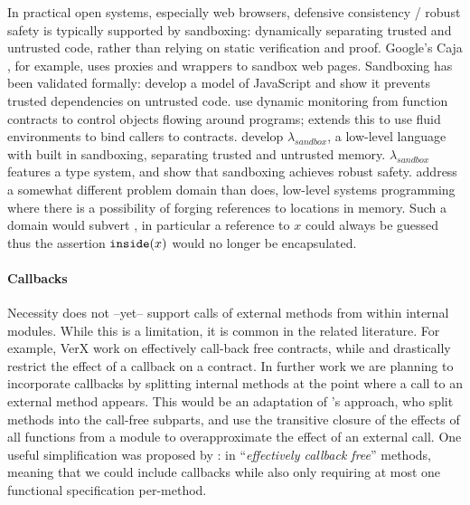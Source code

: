 In practical open systems, especially web browsers, defensive
consistency / robust safety is typically supported by sandboxing: dynamically separating
trusted and untrusted code, rather than relying on static verification
and proof.
Google's Caja \cite{Caja}, for example, uses proxies and wrappers to
sandbox web pages.
Sandboxing has been validated
formally:  \cite{mmt-oakland10} develop a model of
JavaScript and show it prevents trusted dependencies on untrusted code.
%
\cite{DPCC14} use dynamic monitoring from function contracts to
control objects flowing around programs; 
\cite{AuthContract} extends this to use fluid 
environments to bind callers to contracts.
%
\cite{sandbox} develop $\lambda_{sandbox}$, a low-level language with 
built in sandboxing, separating trusted and
untrusted memory. $\lambda_{sandbox}$ features a type system,
and \citeauthor{sandbox} show that sandboxing achieves robust safety.
\citeauthor{sandbox} address a somewhat different
problem domain than \Nec does, low-level systems programming where 
there is a possibility of forging references to locations in memory. Such a domain
would subvert \Nec, %
in particular a reference to $x$ could always be guessed
thus the assertion $\texttt{inside}( x )$ would no longer be encapsulated.

 
\paragraph{Callbacks} 
\label{sec:callbacks}
Necessity does not --yet-- support calls of external methods from within internal modules. 
While this is a limitation, it is common in the related literature. 
For example, VerX \cite{Permenev} work on effectively call-back free contracts, 
while \cite{Grossman} and  \cite{Albert}  drastically restrict  the effect of a callback on a contract. 
In further work we are planning to incorporate callbacks by  
splitting internal methods at the point where a call to an external method appears.
This would be an adaptation of \citeauthor{BraemEilersMuellerSierraSummers21}'s approach,
 who  split methods into the
call-free subparts, and use the transitive closure of the effects of all functions from a module 
to overapproximate the effect of an external call.
One  useful simplification was proposed by 
 : in
``\emph{effectively callback free}'' methods, meaning that we could 
include callbacks while also only requiring at most one functional specification 
per-method.

